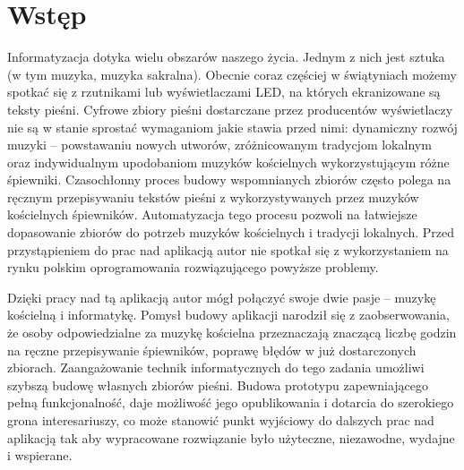 \documentclass[a4paper,12pt]{article}
\newcommand\spacingIndent{2.2em}
\begin{document}
	\newpage 
	\noindent\begin{minipage}[s]{\textwidth}
	\section{Wstęp}
		\hspace{\spacingIndent} Informatyzacja dotyka wielu obszarów naszego       życia. Jednym z nich jest sztuka (w tym muzyka, muzyka        sakralna). Obecnie coraz częściej w świątyniach możemy        spotkać się z rzutnikami lub wyświetlaczami LED, 
			na których ekranizowane są teksty pieśni. Cyfrowe zbiory pieśni dostarczane przez producentów wyświetlaczy 
			nie są w stanie sprostać wymaganiom jakie stawia przed nimi: dynamiczny rozwój muzyki -- powstawaniu nowych utworów, 
			zróżnicowanym tradycjom lokalnym oraz indywidualnym upodobaniom muzyków kościelnych wykorzystującym różne śpiewniki. 
			Czasochłonny proces budowy wspomnianych zbiorów często polega na ręcznym przepisywaniu tekstów pieśni 
			z wykorzystywanych przez muzyków kościelnych śpiewników. Automatyzacja tego procesu pozwoli na łatwiejsze dopasowanie zbiorów 
			do potrzeb muzyków kościelnych i tradycji lokalnych. 
	        Przed przystąpieniem do prac nad aplikacją autor nie      spotkał się z wykorzystaniem na rynku polskim             oprogramowania rozwiązującego powyższe problemy.
		
		 \hspace{\spacingIndent} Dzięki pracy nad tą aplikacją autor mógł połączyć swoje dwie pasje -- muzykę kościelną i informatykę. 
			Pomysł budowy aplikacji narodził się z zaobserwowania, że osoby odpowiedzialne za muzykę kościelna przeznaczają znaczącą liczbę godzin 
			na ręczne przepisywanie śpiewników, poprawę błędów w już dostarczonych zbiorach. Zaangażowanie technik informatycznych do tego zadania 
	        umożliwi szybszą budowę własnych zbiorów pieśni.  
			Budowa prototypu zapewniającego pełną funkcjonalność,  daje możliwość jego opublikowania 
			i dotarcia do szerokiego grona interesariuszy, co może stanowić punkt wyjściowy do dalszych prac nad aplikacją tak aby wypracowane rozwiązanie było użyteczne, niezawodne, wydajne i wspierane.
		

\end{minipage}
\end{document}
